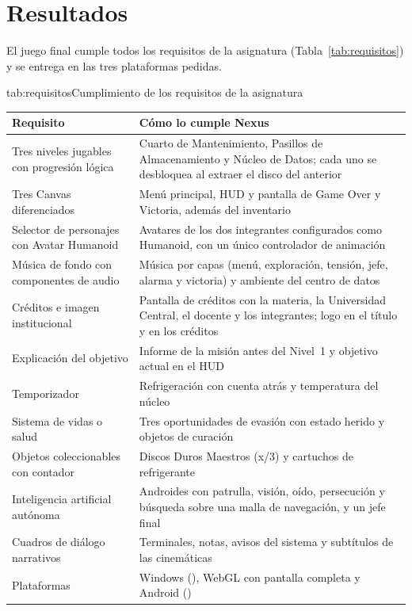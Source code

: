 \section{Resultados}

El juego final cumple todos los requisitos de la asignatura (Tabla~\ref{tab:requisitos}) y se
entrega en las tres plataformas pedidas.

\begin{TablaAPA}{tab:requisitos}{Cumplimiento de los requisitos de la asignatura}
\begin{tabularx}{\linewidth}{P{4.6cm}L}
\toprule
Requisito & Cómo lo cumple Nexus \\
\midrule
Tres niveles jugables con progresión lógica & Cuarto de Mantenimiento, Pasillos de Almacenamiento y Núcleo de Datos; cada uno se desbloquea al extraer el disco del anterior \\
Tres Canvas diferenciados & Menú principal, HUD y pantalla de Game Over y Victoria, además del inventario \\
Selector de personajes con Avatar Humanoid & Avatares de los dos integrantes configurados como Humanoid, con un único controlador de animación \\
Música de fondo con componentes de audio & Música por capas (menú, exploración, tensión, jefe, alarma y victoria) y ambiente del centro de datos \\
Créditos e imagen institucional & Pantalla de créditos con la materia, la Universidad Central, el docente y los integrantes; logo en el título y en los créditos \\
Explicación del objetivo & Informe de la misión antes del Nivel~1 y objetivo actual en el HUD \\
Temporizador & Refrigeración con cuenta atrás y temperatura del núcleo \\
Sistema de vidas o salud & Tres oportunidades de evasión con estado herido y objetos de curación \\
Objetos coleccionables con contador & Discos Duros Maestros (x/3) y cartuchos de refrigerante \\
Inteligencia artificial autónoma & Androides con patrulla, visión, oído, persecución y búsqueda sobre una malla de navegación, y un jefe final \\
Cuadros de diálogo narrativos & Terminales, notas, avisos del sistema y subtítulos de las cinemáticas \\
Plataformas & Windows (), WebGL con pantalla completa y Android () \\
\bottomrule
\end{tabularx}
\end{TablaAPA}

